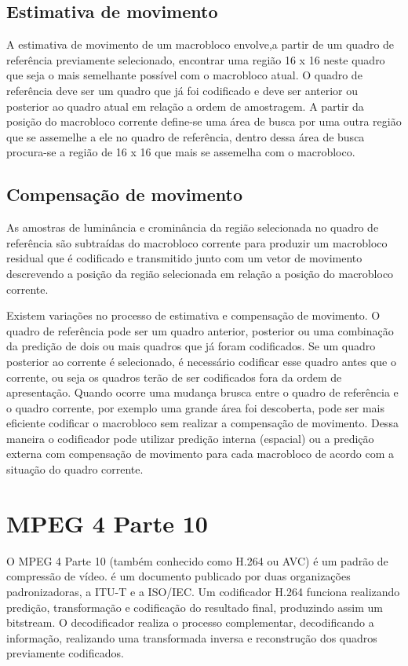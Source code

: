 \subsection{Estimativa de movimento}

A estimativa de movimento de um macrobloco envolve,a partir de um quadro de referência previamente selecionado, encontrar uma região 16 x 16 neste quadro que seja o mais semelhante possível com o macrobloco atual. O quadro de referência deve ser um quadro que já foi codificado e deve ser anterior ou posterior ao quadro atual em relação a ordem de amostragem. A partir da posição do macrobloco corrente define-se uma área de busca por uma outra região que se assemelhe a ele no quadro de referência, dentro dessa área de busca procura-se a região de 16 x 16 que mais se assemelha com o macrobloco.


\subsection{Compensação de movimento}

As amostras de luminância e crominância da região selecionada no quadro de referência são subtraídas do macrobloco corrente para produzir um macrobloco residual que é codificado e transmitido junto com um vetor de movimento descrevendo a posição da região selecionada em relação a posição do macrobloco corrente.

Existem variações no processo de estimativa e compensação de movimento. O quadro de referência pode ser um quadro anterior, posterior ou uma combinação da predição de dois ou mais quadros que já foram codificados. Se um quadro posterior ao corrente é selecionado, é necessário codificar esse quadro antes que o corrente, ou seja os quadros terão de ser codificados fora da ordem de apresentação. Quando ocorre uma mudança brusca entre o quadro de referência e o quadro corrente, por exemplo uma grande área foi descoberta, pode ser mais eficiente codificar o macrobloco sem realizar a compensação de movimento. Dessa maneira o codificador pode utilizar predição interna (espacial) ou a predição externa com compensação de movimento para cada macrobloco de acordo com a situação do quadro corrente. 


\section{MPEG 4 Parte 10}

O MPEG 4 Parte 10 (também conhecido como H.264 ou AVC) é um padrão de compressão de vídeo. \cite{ituh264avc} é um documento publicado por duas organizações padronizadoras, a ITU-T e a ISO/IEC. Um codificador H.264 funciona realizando predição, transformação e codificação do resultado final, produzindo assim um bitstream. O decodificador realiza o processo complementar, decodificando a informação, realizando uma transformada inversa e reconstrução dos quadros previamente codificados.


